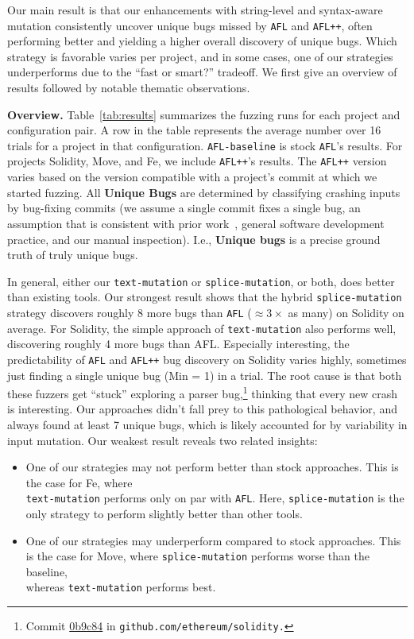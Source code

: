 Our main result is that our enhancements with string-level and syntax-aware
mutation consistently uncover unique bugs missed by \texttt{AFL} and
\texttt{AFL++}, often performing better and yielding a higher overall discovery
of unique bugs. Which strategy is favorable varies per project, and in some
cases, one of our strategies underperforms due to the ``fast or smart?''
tradeoff. We first give an overview of results followed by notable
thematic observations.

\noindent \textbf{Overview.} Table~\ref{tab:results} summarizes the fuzzing
runs for each project and configuration pair. A row in the table represents the
average number over 16 trials for a project in that configuration.
\texttt{AFL-baseline} is stock \texttt{AFL}'s results. For projects Solidity,
Move, and Fe, we include \texttt{AFL++}'s results. The \texttt{AFL++} version
varies based on the version compatible with a project's commit at which we
started fuzzing. All \textbf{Unique Bugs} are determined by classifying crashing
inputs by bug-fixing commits (we assume a single commit fixes a single bug, an
assumption that is consistent with prior
work~\cite{semantic-crash-bucketing,Taming}, general software development
practice, and our manual inspection). I.e., \textbf{Unique bugs} is a precise
ground truth of truly unique bugs.

In general, either our \texttt{text-mutation} or \texttt{splice-mutation}, or
both, does better than existing tools. Our strongest result shows that the
hybrid \texttt{splice-mutation} strategy discovers roughly 8 more bugs than
\texttt{AFL} ($\approx3\times$ as many) on Solidity on average. For Solidity,
the simple approach of \texttt{text-mutation} also performs well, discovering
roughly 4 more bugs than AFL. Especially interesting, the predictability of
\texttt{AFL} and \texttt{AFL++} bug discovery on Solidity varies highly,
sometimes just finding a single unique bug (Min = 1) in a trial. The root cause
is that both these fuzzers get ``stuck'' exploring a parser
bug,\footnote{Commit
\href{https://github.com/ethereum/solidity/commit/0b9c842656c644c209280e5f570f94dee77a1606}{0b9c84}
in \texttt{github.com/ethereum/solidity.}} thinking that every new crash is
interesting. Our approaches didn't fall prey to this pathological behavior, and
always found at least 7 unique bugs, which is likely accounted for by
variability in input mutation. Our weakest result reveals two related insights:

\begin{itemize}
\item One of our strategies may not perform better than stock approaches. This is the case for Fe, where \\ \texttt{text-mutation} performs only on par with \texttt{AFL}. Here, \texttt{splice-mutation} is the only strategy to perform slightly better than other tools.
\item One of our strategies may underperform compared to stock approaches. This is the case for Move, where \texttt{splice-mutation} performs worse than the baseline, \\ whereas \texttt{text-mutation} performs best.
\end{itemize}

